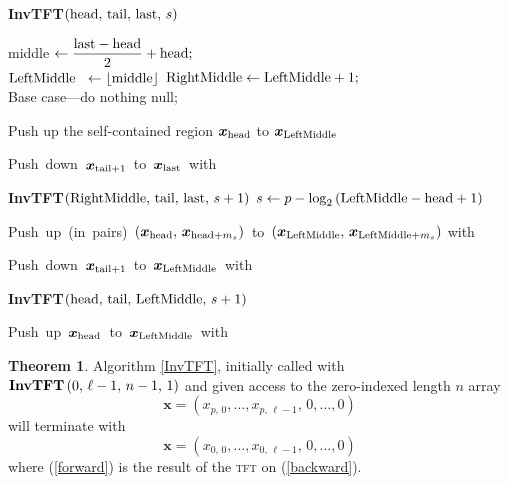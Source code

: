 \documentclass[12pt]{article}
\theoremstyle{definition}
\newcommand{\brac}[1]{\left( #1 \right)}
\newcommand{\xx}{\boldsymbol{x}}
\newcommand{\0}{\mathbf{0}}
\theoremstyle{theorem}
\newtheorem{theorem}{Theorem}
\theoremstyle{definition}
\begin{document}
\begin{algorithm}

\setlength{\parskip}{0.65ex}

\caption{\textbf{InvTFT}$(\text{head},\, \text{tail},\, \text{last},\, s)$}
\label{InvTFT}

\Input{ InvTFT$\brac{0,\, \ell-1 ,\, n-1,\,1}$; }



\BlankLine
middle $\gets \dfrac{ \text{last} - \text{head}}{2} + \text{head};$\\[0.5em]

$\text{LeftMiddle}  \;\,\, \gets \lfloor {\rm middle} \rfloor$\;
$\text{RightMiddle} \gets \text{LeftMiddle} + 1;$\\[1em]

\If {\rm $\head > \tail$} { 
	Base case---do nothing\;
	\Return null;
}


\ElseIf {\rm $\tail \geq \LM$} {
	Push up the self-contained region $\xx_\head$ to $\xx_\LM$\;
	
	\mbox{Push down $\xx_{\tail+1}$ to $\xx_{\last}$ with }~\;
	
	{\bf InvTFT}$\brac{\RM,\, \tail,\, \last,\, s+1}$\;
	$s \gets p - \log_2 \brac{\LM - \head + 1}$\;

	\mbox{Push up (in pairs) $\brac{\xx_\head,\, \xx_{\head+m_s}}$ to $\brac{\xx_\LM,\, \xx_{\LM+m_s}}$} 		\mbox{with }~\;
	
	
}
\ElseIf {\rm$\tail < \LM$} {


	\mbox{Push down $\xx_{\tail+1}$ to $\xx_{\LM}$ with }\;
	
	{\bf InvTFT}$\brac{\head,\, \tail,\, \LM,\, s+1}$\;
	
\mbox{Push up $\xx_\head$ to $\xx_\LM$ with }\;

}



\end{algorithm}
 

\begin{theorem}
Algorithm \ref{InvTFT}, initially called with ${\rm \bf InvTFT}\brac{0,\, \ell-1 ,\, n-1,\,1}$ and given access to the zero-indexed length $n$ array
\begin{equation}\label{forward}
\xx = \brac{x_{p,\,0}, \ldots, x_{p,\,\ell-1},\, 0, \ldots,0}
\end{equation}
will terminate with
\begin{equation}\label{backward}
\xx = \brac{x_{0,\,0}, \ldots, x_{0,\,\ell-1},\, 0, \ldots,0}
\end{equation}
where (\ref{forward}) is the result of the \textsc{tft} on (\ref{backward}).
\end{theorem}
\end{document}
